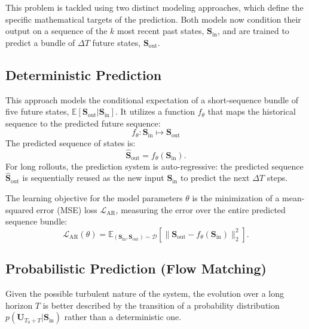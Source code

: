 This problem is tackled using two distinct modeling approaches, which define the specific mathematical targets of the prediction. Both models now condition their output on a sequence of the $k$ most recent past states, $\mathbf{S}_{\text{in}}$, and are trained to predict a bundle of $\Delta T$ future states, $\mathbf{S}_{\text{out}}$.

\subsection{Deterministic Prediction}
This approach models the conditional expectation of a short-sequence bundle of five future states, $\mathbb{E}[\mathbf{S}_{\text{out}} | \mathbf{S}_{\text{in}}]$. It utilizes a function $f_{\theta}$ that maps the historical sequence to the predicted future sequence:
\begin{equation}
f_{\theta}: \mathbf{S}_{\text{in}} \mapsto \mathbf{S}_{\text{out}}
\end{equation}
The predicted sequence of states is:
\begin{equation}
\hat{\mathbf{S}}_{\text{out}} = f_{\theta}(\mathbf{S}_{\text{in}}).
\end{equation}
For long rollouts, the prediction system is auto-regressive: the predicted sequence $\hat{\mathbf{S}}_{\text{out}}$ is sequentially reused as the new input $\mathbf{S}_{\text{in}}$ to predict the next $\Delta T$ steps.

The learning objective for the model parameters $\theta$ is the minimization of a mean-squared error (MSE) loss $\mathcal{L}_{\text{AR}}$, measuring the error over the entire predicted sequence bundle:
\begin{equation}
\mathcal{L}_{\text{AR}}(\theta) = \mathbb{E}_{(\mathbf{S}_{\text{in}}, \mathbf{S}_{\text{out}}) \sim \mathcal{D}} \left[ \| \mathbf{S}_{\text{out}} - f_{\theta}(\mathbf{S}_{\text{in}}) \|_2^2 \right].
\end{equation}

\subsection{Probabilistic Prediction (Flow Matching)}
Given the possible turbulent nature of the system, the evolution over a long horizon $T$ is better described by the transition of a probability distribution $p(\mathbf{U}_{T_0+T} | \mathbf{S}_{\text{in}})$ rather than a deterministic one.

